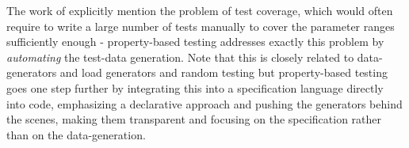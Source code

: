 The work of \cite{onggo_test-driven_2016} explicitly mention the problem of test coverage, which would often require to write a large number of tests manually to cover the parameter ranges sufficiently enough - property-based testing addresses exactly this problem by \textit{automating} the test-data generation. Note that this is closely related to data-generators \cite{gurcan_generic_2013} and load generators and random testing \cite{burnstein_practical_2010} but property-based testing goes one step further by integrating this into a specification language directly into code, emphasizing a declarative approach and pushing the generators behind the scenes, making them transparent and focusing on the specification rather than on the data-generation. 
